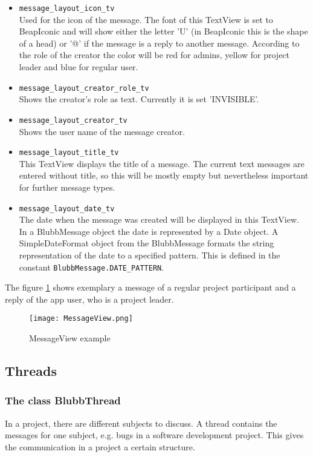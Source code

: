 \documentclass[12pt,a4paper,oneside]{report}
\newcommand{\code}[1]{\lstinline{#1}}
\begin{document}
\begin{itemize}
\item \code{message_layout_icon_tv}\\
Used for the icon of the message. The font of this TextView is set to BeapIconic and will show either the letter 'U' (in BeapIconic this is the shape of a head) or '@' if the message is a reply to another message. According to the role of the creator the color will be red for admins, yellow for project leader and blue for regular user.

\item \code{message_layout_creator_role_tv}\\
Shows the creator's role as text. Currently it is set 'INVISIBLE'.

\item \code{message_layout_creator_tv}\\
Shows the user name of the message creator.

\item \code{message_layout_title_tv}\\
This TextView displays the title of a message. The current text messages are entered without title, so this will be mostly empty but nevertheless important for further message types.

\item \code{message_layout_date_tv}\\
The date when the message was created will be displayed in this TextView. In a BlubbMessage object the date is represented by a Date object. A SimpleDateFormat object from the BlubbMessage formats the string representation of the date to a specified pattern. This is defined in the constant \code{BlubbMessage.DATE_PATTERN}.

\end{itemize}

The figure \ref{fig:MessageViewEx} shows exemplary a message of a regular project participant and a reply of the app user, who is a project leader.
\begin{figure}[!ht]
	\centering
    \texttt{[image: MessageView.png]}
	\caption{MessageView example}
	\label{fig:MessageViewEx}
\end{figure}

\subsection{Threads}
\subsubsection{The class BlubbThread}
In a project, there are different subjects to discuss. A thread contains the messages for one subject, e.g. bugs in a software development project. This gives the communication in a project a certain structure. 
\end{document}
